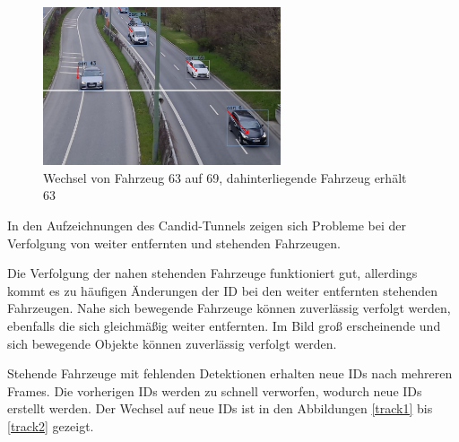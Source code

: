\documentclass[conference]{IEEEtran}
\begin{document}
	\begin{figure}[!h]
		\begin{center}
			\includegraphics[width=7cm]{Media/switch4.jpg}
			\caption{Wechsel von Fahrzeug 63 auf 69, dahinterliegende Fahrzeug erhält 63}
			\label{track6}
		\end{center}
	\end{figure}
	
	
	In den Aufzeichnungen des Candid-Tunnels zeigen sich Probleme bei der Verfolgung von weiter entfernten und stehenden Fahrzeugen.
	
	Die Verfolgung der nahen stehenden Fahrzeuge funktioniert gut, allerdings kommt es zu
	häufigen Änderungen der ID bei den weiter entfernten stehenden Fahrzeugen.
	Nahe sich bewegende Fahrzeuge können zuverlässig verfolgt werden, ebenfalls die sich gleichmäßig weiter entfernten. Im Bild groß erscheinende und sich bewegende Objekte können zuverlässig verfolgt werden.
	
	Stehende Fahrzeuge mit fehlenden Detektionen erhalten neue IDs nach mehreren
	Frames. Die vorherigen IDs werden zu schnell verworfen, wodurch neue IDs erstellt werden.
	Der Wechsel auf neue IDs ist in den Abbildungen \ref{track1} bis \ref{track2} 
	gezeigt.
	
\end{document}
